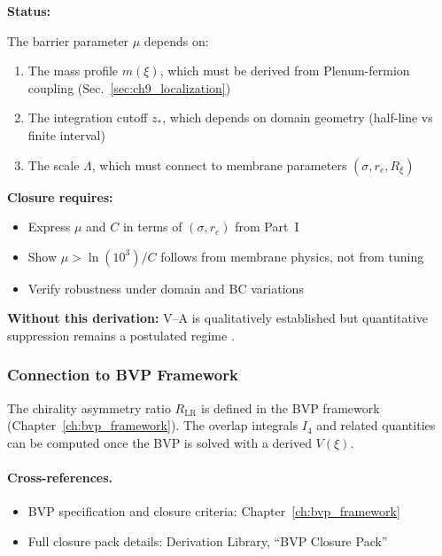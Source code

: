\begin{tcolorbox}[colback=red!5!white, colframe=red!50!black,
    title=\textbf{Closure Condition: Derive $\mu$ from Membrane Parameters}]
\label{box:va_mu_closure}

\textbf{Status:} \tagOPEN{}

The barrier parameter $\mu$ depends on:
\begin{enumerate}[nosep]
    \item The mass profile $m(\xi)$, which must be derived from Plenum-fermion
          coupling (Sec.~\ref{sec:ch9_localization})
    \item The integration cutoff $z_*$, which depends on domain geometry
          (half-line vs finite interval)
    \item The scale $\Lambda$, which must connect to membrane parameters
          $(\sigma, r_e, R_\xi)$
\end{enumerate}

\textbf{Closure requires:}
\begin{itemize}[nosep]
    \item Express $\mu$ and $C$ in terms of $(\sigma, r_e)$ from Part~I
    \item Show $\mu > \ln(10^3)/C$ follows from membrane physics, not from tuning
    \item Verify robustness under domain and BC variations
\end{itemize}

\textbf{Without this derivation:} V--A is qualitatively established but
quantitative suppression remains a postulated regime \tagP{}.
\end{tcolorbox}

\subsubsection{Connection to BVP Framework}

The chirality asymmetry ratio $R_{\text{LR}}$ is defined in the BVP framework
(Chapter~\ref{ch:bvp_framework}). The overlap integrals
$I_4$ and related quantities can be computed once the BVP is solved with
a derived $V(\xi)$.

\paragraph{Cross-references.}
\begin{itemize}[nosep]
    \item BVP specification and closure criteria: Chapter~\ref{ch:bvp_framework}
    \item Full closure pack details: Derivation Library, ``BVP Closure Pack''
\end{itemize}

